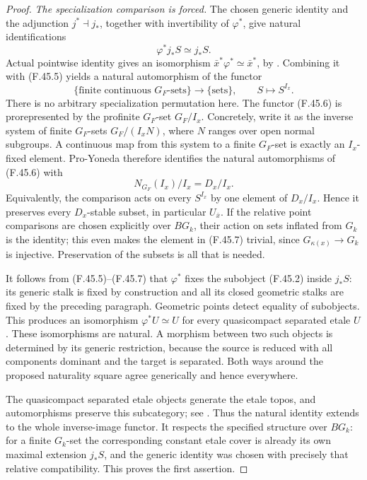 \documentclass[11pt]{article}
\begin{document}
\begin{proof}
\emph{The specialization comparison is forced.}
The chosen generic identity and the adjunction
\(j^*\dashv j_*\), together with invertibility of
\(\varphi^*\), give natural identifications
\[
                             \varphi^*j_*S\simeq j_*S.
                                                        \tag{F.45.5}
\]
Actual pointwise identity gives an isomorphism
\(\bar x^*\varphi^*\simeq\bar x^*\), by
\citet[Proposition~3.6]{FF_CHW2024}. Combining it with
(F.45.5) yields a natural automorphism of the functor
\[
       \{\text{finite continuous }G_F\text{-sets}\}
          \longrightarrow\{\text{sets}\},\qquad
                            S\longmapsto S^{I_x}.
                                                        \tag{F.45.6}
\]
There is no arbitrary specialization permutation here.
The functor (F.45.6) is prorepresented by the profinite
\(G_F\)-set \(G_F/I_x\). Concretely, write it as the
inverse system of finite \(G_F\)-sets
\(G_F/(I_xN)\), where \(N\) ranges over open normal
subgroups. A continuous map from this system to a finite
\(G_F\)-set is exactly an \(I_x\)-fixed element.
Pro-Yoneda therefore identifies the natural automorphisms
of (F.45.6) with
\[
                      N_{G_F}(I_x)/I_x=D_x/I_x.
                                                        \tag{F.45.7}
\]
Equivalently, the comparison acts on every \(S^{I_x}\)
by one element of \(D_x/I_x\). Hence it preserves
every \(D_x\)-stable subset, in particular
\(U_{\bar x}\). If the relative point comparisons are
chosen explicitly over \(BG_k\), their action on sets
inflated from \(G_k\) is the identity; this even makes
the element in (F.45.7) trivial, since
\(G_{\kappa(x)}\to G_k\) is injective. Preservation of
the subsets is all that is needed.

It follows from (F.45.5)--(F.45.7) that \(\varphi^*\)
fixes the subobject (F.45.2) inside \(j_*S\): its
generic stalk is fixed by construction and all its closed
geometric stalks are fixed by the preceding paragraph.
Geometric points detect equality of subobjects. This
produces an isomorphism \(\varphi^*U\simeq U\) for
every quasicompact separated etale \(U\). These
isomorphisms are natural. A morphism between two such
objects is determined by its generic restriction, because
the source is reduced with all components dominant and
the target is separated. Both ways around the proposed
naturality square agree generically and hence everywhere.

The quasicompact separated etale objects generate the
etale topos, and automorphisms preserve this subcategory;
see \citet[Theorem~A.8, Corollaries~A.9 and~A.11]
{FF_CHW2024}. Thus the natural identity extends to the
whole inverse-image functor. It respects the specified
structure over \(BG_k\): for a finite \(G_k\)-set the
corresponding constant etale cover is already its own
maximal extension \(j_*S\), and the generic identity
was chosen with precisely that relative compatibility.
This proves the first assertion.


\end{proof}
\end{document}
